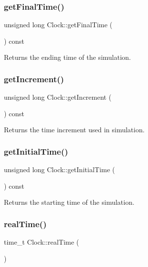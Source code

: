 \subsubsection{\texorpdfstring{getFinalTime()}{getFinalTime()}}
{\footnotesize\ttfamily unsigned long Clock\+::get\+Final\+Time (\begin{DoxyParamCaption}{ }\end{DoxyParamCaption}) const}

\begin{DoxyReturn}{Returns}
the ending time of the simulation. 
\end{DoxyReturn}
\mbox{\label{class_clock_a804626d5455f4a2a73321f84ed7a9819}} 
\subsubsection{\texorpdfstring{getIncrement()}{getIncrement()}}
{\footnotesize\ttfamily unsigned long Clock\+::get\+Increment (\begin{DoxyParamCaption}{ }\end{DoxyParamCaption}) const}

\begin{DoxyReturn}{Returns}
the time increment used in simulation. 
\end{DoxyReturn}
\mbox{\label{class_clock_a9792f62fed3c320abecc5c455b13a804}} 
\subsubsection{\texorpdfstring{getInitialTime()}{getInitialTime()}}
{\footnotesize\ttfamily unsigned long Clock\+::get\+Initial\+Time (\begin{DoxyParamCaption}{ }\end{DoxyParamCaption}) const}

\begin{DoxyReturn}{Returns}
the starting time of the simulation. 
\end{DoxyReturn}
\mbox{\label{class_clock_a29512d39298cafed334d0c01da70ea7b}} 
\subsubsection{\texorpdfstring{realTime()}{realTime()}}
{\footnotesize\ttfamily time\+\_\+t Clock\+::real\+Time (\begin{DoxyParamCaption}{ }\end{DoxyParamCaption})}

